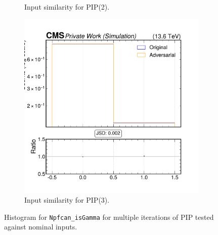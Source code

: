 \begin{figure}[h]
\begin{subfigure}[t]{0.32\textwidth}
    \caption{Input similarity for PIP(2).}
  \end{subfigure}\hfill
  \begin{subfigure}[t]{0.32\textwidth}
    \includegraphics[width=\linewidth]{media/output/features/compare/intprob_3/cmp_npf_arr_Npfcan_isGamma.pdf}
    \caption{Input similarity for PIP(3).}
  \end{subfigure}

  \caption{Histogram for \texttt{Npfcan\_isGamma} for multiple iterations of PIP tested against nominal inputs.}
  \label{fig:intprob_input_Npfcan_isGamma}
\end{figure}